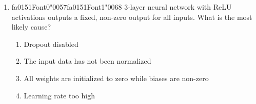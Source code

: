 \documentclass[12pt]{article}
\begin{document}
\begin{enumerate}[label=Q\arabic*.]
 \begin{enumerate}[label=(\Alph*)]
     \item Cross-entropy loss misconfigured
     \item The final layer is using Softmax without temperature scaling
     \item Learning rate too high
     \item All pre-activation values are negative in the first layer
 \end{enumerate}
 
 \item {\csname fa0151Font0\endcsname\char"0057}{\csname fa0151Font1\endcsname\char"0068} 3-layer neural network with ReLU activations outputs a fixed, non-zero output for all inputs. What is the most likely cause?
 \begin{enumerate}[label=(\Alph*)]
     \item Dropout disabled
     \item The input data has not been normalized
     \item All weights are initialized to zero while biases are non-zero
     \item Learning rate too high
 \end{enumerate}
 

\end{enumerate}
\end{document}
